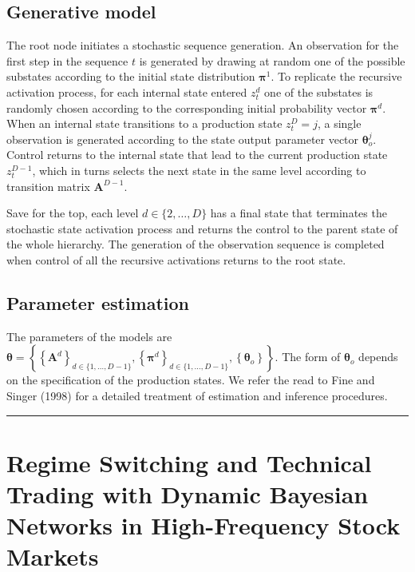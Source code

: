 \documentclass[]{article}
\newcommand{\mat}[1]{\bm{#1}}
\begin{document}
\subsection{Generative model}\label{generative-model}

The root node initiates a stochastic sequence generation. An observation
for the first step in the sequence \(t\) is generated by drawing at
random one of the possible substates according to the initial state
distribution \(\mat{\pi}^1\). To replicate the recursive activation
process, for each internal state entered \(z_t^d\) one of the substates
is randomly chosen according to the corresponding initial probability
vector \(\mat{\pi}^d\). When an internal state transitions to a
production state \(z_t^D = j\), a single observation is generated
according to the state output parameter vector \(\mat{\theta}_o^j\).
Control returns to the internal state that lead to the current
production state \(z_t^{D-1}\), which in turns selects the next state in
the same level according to transition matrix \(\mat{A}^{D-1}\).

Save for the top, each level \(d \in \{2, \dots, D\}\) has a final state
that terminates the stochastic state activation process and returns the
control to the parent state of the whole hierarchy. The generation of
the observation sequence is completed when control of all the recursive
activations returns to the root state.

\subsection{Parameter estimation}\label{parameter-estimation}

The parameters of the models are
\(\mat{\theta} = \left\{ \left\{ \mat{A}^d \right\}_{d \in \{1, \dots, D - 1\}}, \left\{ \mat{\pi}^d \right\}_{d \in \{1, \dots, D - 1\}}, \left\{ \mat{\theta}_o \right\} \right\}\).
The form of \(\mat{\theta}_o\) depends on the specification of the
production states. We refer the read to Fine and Singer (1998) for a
detailed treatment of estimation and inference procedures.

\begin{center}\rule{0.5\linewidth}{\linethickness}\end{center}

\section{Regime Switching and Technical Trading with Dynamic Bayesian
Networks in High-Frequency Stock
Markets}\label{regime-switching-and-technical-trading-with-dynamic-bayesian-networks-in-high-frequency-stock-markets}
\end{document}
